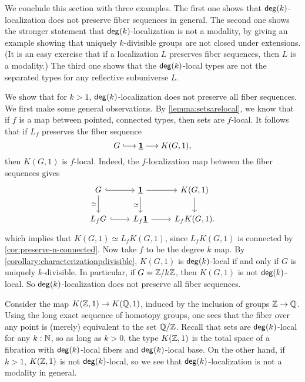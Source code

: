 We conclude this section with three examples.
The first one shows that $\mathsf{deg}(k)$-localization does not preserve fiber sequences in general.
The second one shows the stronger statement that $\mathsf{deg}(k)$-localization is not a modality,
by giving an example showing that uniquely $k$-divisible groups are not closed under extensions.
(It is an easy exercise that if a localization $L$ preserves fiber sequences,
then $L$ is a modality.)
The third one shows that the $\mathsf{deg}(k)$-local types are not the separated types
for any reflective subuniverse $L$.

\begin{eg}\label{example:notlex}
    We show that for $k > 1$, $\mathsf{deg}(k)$-localization
    does not preserve all fiber sequences.
    We first make some general observations.
    By \cref{lemma:setsarelocal}, we know that if $f$ is a map between pointed,
    connected types, then sets are $f$-local.
    It follows that if $L_f$ preserves the fiber sequence
    \[
        G \longhookrightarrow \unit \lra K(G,1),
    \]
    then $K(G,1)$ is $f$-local.
    Indeed, the $f$-localization map between the fiber sequences gives
\begin{equation*}
\begin{tikzcd}
G \arrow[d,swap,"\eqvsym"] \arrow[r,hookrightarrow] & \unit \arrow[d,swap,"\eqvsym"] \arrow[r] & K(G,1) \arrow[d] \\
L_f G \arrow[r,hookrightarrow] & L_f\unit \arrow[r] & L_f K(G,1).
\end{tikzcd}
\end{equation*}
    which implies that $K(G,1) \simeq L_f K(G,1)$, since $L_f K(G,1)$ is connected
    by \cref{cor:preserve-n-connected}.
    Now take $f$ to be the degree $k$ map.
    By \cref{corollary:characterizationpdivisible}, $K(G,1)$ is $\mathsf{deg}(k)$-local if and only if
    $G$ is uniquely $k$-divisible.
    In particular, if $G = \mathbb{Z}/k\mathbb{Z}$, then $K(G,1)$ is not $\mathsf{deg}(k)$-local.
    So $\mathsf{deg}(k)$-localization does not preserve all fiber sequences.
\end{eg}


\begin{eg}\label{example:nonlocalfib2}
    Consider the map $K(\mathbb{Z},1) \to K(\mathbb{Q},1)$, induced by the inclusion of groups $\mathbb{Z} \to \mathbb{Q}$.
    Using the long exact sequence of homotopy groups, one sees that the fiber over any point is
    (merely) equivalent to the set $\mathbb{Q}/\mathbb{Z}$. Recall that sets are $\mathsf{deg}(k)$-local for any $k : \mathbb{N}$,
    so as long as $k > 0$, the type $K(\mathbb{Z},1)$ is the total space of a fibration with $\mathsf{deg}(k)$-local fibers and $\mathsf{deg}(k)$-local base.
    On the other hand, if $k > 1$, $K(\mathbb{Z},1)$ is not $\mathsf{deg}(k)$-local, so we see that $\mathsf{deg}(k)$-localization
    is not a modality in general.
\end{eg}

